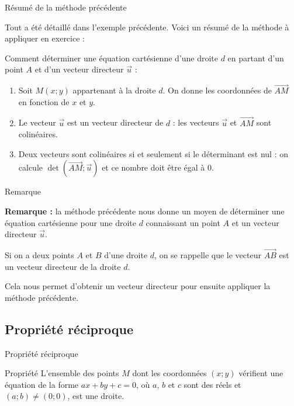 \documentclass[12pt]{beamer}
\begin{document}
\begin{frame}{Résumé de la méthode précédente}

Tout a été détaillé dans l'exemple précédente. Voici un résumé de la méthode à appliquer en exercice :

\bigskip

Comment déterminer une équation cartésienne d'une droite $d$ en partant d'un point $A$ et d'un vecteur directeur $\overrightarrow{u}$ :

\bigskip

\begin{enumerate}
\item Soit $M(x;y)$ appartenant à la droite $d$. On donne les coordonnées de $\overrightarrow{AM}$ en fonction de $x$ et $y$.
\item Le vecteur $\overrightarrow{u}$ est un vecteur directeur de $d$ : les vecteurs $\overrightarrow{u}$ et $\overrightarrow{AM}$ sont colinéaires. 
\item Deux vecteurs sont colinéaires si et seulement si le déterminant est nul : on calcule $\det(\overrightarrow{AM} ; \overrightarrow{u})$ et ce nombre doit être égal à $0$.
\end{enumerate}

\end{frame}

\begin{frame}{Remarque}

\textbf{Remarque : } la méthode précédente nous donne un moyen de déterminer une équation cartésienne pour une droite $d$ connaissant un point $A$ et un vecteur directeur $\overrightarrow{u}$.

\bigskip

Si on a deux points $A$ et $B$ d'une droite $d$, on se rappelle que le vecteur $\overrightarrow{AB}$ est un vecteur directeur de la droite $d$. \par 
Cela nous permet d'obtenir un vecteur directeur pour ensuite appliquer la méthode précédente. 

\end{frame}

\subsection{Propriété réciproque}

\begin{frame}{Propriété réciproque}

\begin{exampleblock}{Propriété}
L'ensemble des points $M$ dont les coordonnées $(x;y)$ vérifient une équation de la forme $ax+by+c=0$, où $a$, $b$ et $c$ sont des réels et $(a;b) \neq (0;0)$, est une droite. 
\end{exampleblock}

\end{frame}
\end{document}
